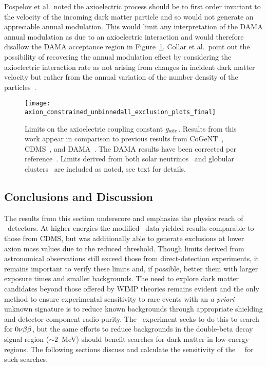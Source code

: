	Pospelov et al.~noted the axioelectric process should be to first order invariant to the velocity of the incoming dark matter particle and so would not generate an appreciable annual modulation.  This would limit any interpretation of the DAMA annual modulation as due to an axioelectric interaction and would therefore disallow the DAMA acceptance region in Figure~\ref{fig:HeavyAxionLimits}.  Collar et al.~point out the possibility of recovering the annual modulation effect by considering the axioelectric interaction rate as not arising from changes in incident dark matter velocity but rather from the annual variation of the number density of the particles~\cite{Collar:2009sp}. 
			
		\begin{figure}
			\centering
			\texttt{[image: axion\_constrained\_unbinnedall\_exclusion\_plots\_final]}
			\caption[Limits on the axioelectric coupling constant $\gaa$]{Limits on the axioelectric 
			coupling constant $\gaa$.  Results from this work appear in comparison to previous 
			results from CoGeNT~\cite{Aalseth:2008aa}, CDMS~\cite{Ahmed2009}, and 
			DAMA~\cite{Bernabei:2005ca}.  The DAMA results have been corrected per 
			reference~\cite{Collar:2009sp}.  Limits derived from both solar neutrinos~\cite{Gondolo09} and globular clusters~\cite{Raffelt95} are included as noted, see text for details.}
			\label{fig:HeavyAxionLimits}
		\end{figure}
		
	\subsection{Conclusions and Discussion}
	\label{sec:DiscOnHeavyAxionLimits}	

	
	The results from this section underscore and emphasize the physics reach of \ppc~detectors. At higher energies the modified-\bege~data yielded results comparable to those from CDMS, but was additionally able to generate exclusions at lower axion mass values due to the reduced threshold.  Though limits derived from astronomical observations still exceed those from direct-detection experiments, it remains important to verify these limits and, if possible, better them with larger exposure times and smaller backgrounds.  The need to explore dark matter candidates beyond those offered by WIMP theories remains evident and the only method to ensure experimental sensitivity to rare events with an \emph{a priori} unknown signature is to reduce known backgrounds through appropriate shielding and detector component radio-purity.  The \MJ~experiment seeks to do this to search for $0 \nu \beta \beta$, but the same efforts to reduce backgrounds in the double-beta decay signal region ($\sim2$~MeV) should benefit searches for dark matter in low-energy regions.  The following sections discuss and calculate the sensitivity of the \MJ~\minmod~for such searches.
							
